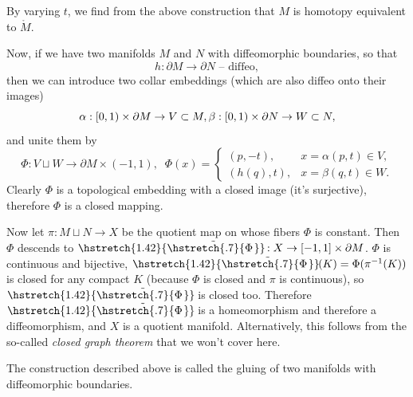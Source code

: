 \documentclass[english,letterpaper]{article}%
\numberwithin{equation}{section}
\numberwithin{figure}{section}
\numberwithin{table}{section}
\theoremstyle{definition}
\theoremstyle{definition}
\theoremstyle{definition}
\theoremstyle{plain}
\theoremstyle{plain}
\theoremstyle{plain}
\theoremstyle{plain}
\theoremstyle{remark}
\theoremstyle{remark}
\newcommand\wt[1]{\hstretch{1.42}{\tilde{\hstretch{.7}{#1\mkern2mu}}}\mkern-2mu}
\begin{document}
\begin{cor}
By varying $t$, we find from the above construction that $M$ is homotopy equivalent to $\mathring{M}$.
\end{cor}

Now, if we have two manifolds $M$ and $N$ with diffeomorphic boundaries, so that
\[h:\partial M\to \partial N\text{ -- diffeo},\]
then we can introduce two collar embeddings (which are also diffeo onto their images)
\[
\alpha:[0,1)\times\partial M\to V\subset M,\\
\beta:[0,1)\times\partial N\to W\subset N,
\]
and unite them by
\[
\Phi: V\sqcup W\to \partial M\times (-1,1),\;\; \Phi(x)=
\begin{cases}
(p,-t),& x=\alpha(p,t)\in V,\\
(h(q),t),& x=\beta(q,t)\in W.
\end{cases}
\]
Clearly $\Phi$  is a topological embedding with a closed image (it's surjective), therefore $\Phi$ is a closed mapping.

Now let $\pi:M\sqcup N\to X$ be the quotient map on whose fibers $\Phi$ is constant. Then $\Phi$ descends to $\wt{\Phi}:X\to [-1,1]\times\partial M$. $\Phi$ is continuous and bijective, $\wt{\Phi}(K)=\Phi(\pi^{-1}(K))$ is closed for any compact $K$ (because $\Phi$ is closed and $\pi$ is continuous), so $\wt{\Phi}$ is closed too. Therefore $\wt{\Phi}$ is a homeomorphism and therefore a diffeomorphism, and $X$ is a quotient manifold. Alternatively, this follows from the so-called \emph{closed graph theorem} that we won't cover here.

\begin{defn}
The construction described above is called the gluing of two manifolds with diffeomorphic boundaries. 
\end{defn}
\end{document}
